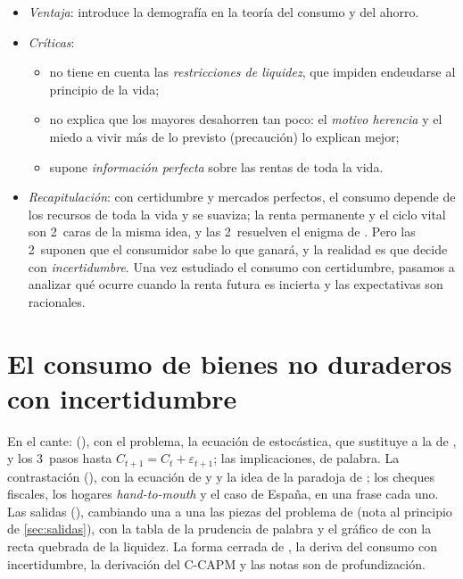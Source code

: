 \documentclass[11pt]{article}
\begin{document}
\begin{itemize}
\item \emph{Ventaja}: introduce la demografía en la teoría del consumo y del ahorro.
\item \emph{Críticas}:
  \begin{itemize}
  \item no tiene en cuenta las \emph{restricciones de liquidez}, que impiden endeudarse al principio de la vida;
  \item no explica que los mayores desahorren tan poco: el \emph{motivo herencia} y el miedo a vivir más de lo previsto (precaución) lo explican mejor;
  \item supone \emph{información perfecta} sobre las rentas de toda la vida.
  \end{itemize}
\end{itemize}

\begin{itemize}
\item \emph{Recapitulación}: con certidumbre y mercados perfectos, el consumo depende de los recursos de toda la vida y se suaviza; la renta permanente y el ciclo vital son 2~caras de la misma idea, y las 2~resuelven el enigma de . Pero las 2~suponen que el consumidor sabe lo que ganará, y la realidad es que decide con \emph{incertidumbre}. Una vez estudiado el consumo con certidumbre, pasamos a analizar qué ocurre cuando la renta futura es incierta y las expectativas son racionales.
\end{itemize}

\section{El consumo de bienes no duraderos\cortetitulo{} con incertidumbre}\label{sec:incertidumbre}

\begin{notaopositor}
En el cante:  (), con el problema, la ecuación de  estocástica, que sustituye a la de , y los 3~pasos hasta $C_{t+1}=C_t+\varepsilon_{t+1}$; las implicaciones, de palabra. La contrastación (), con la ecuación de  y  y la idea de la paradoja de ; los cheques fiscales, los hogares \emph{hand-to-mouth} y el caso de España, en una frase cada uno. Las salidas (), cambiando una a una las piezas del problema de  (nota al principio de \ref{sec:salidas}), con la tabla de la prudencia de palabra y el gráfico de  con la recta quebrada de la liquidez. La forma cerrada de , la deriva del consumo con incertidumbre, la derivación del C-CAPM y las notas son de profundización.
\end{notaopositor}
\end{document}
